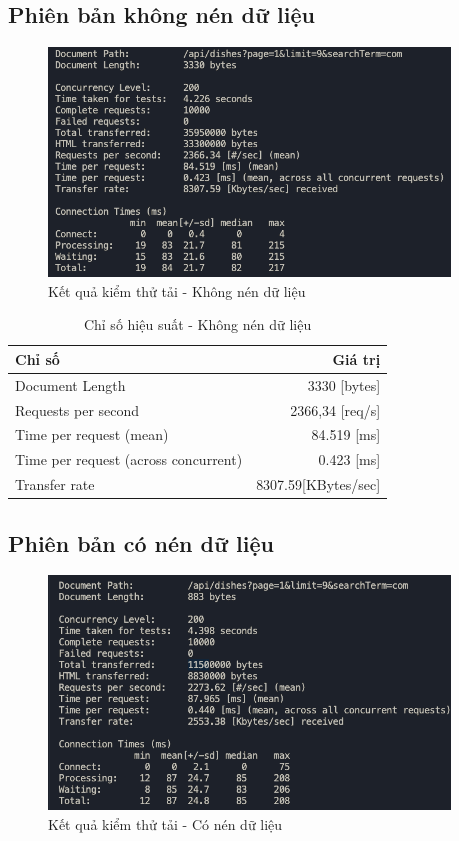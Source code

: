 \subsection{Phiên bản không nén dữ liệu}
\begin{figure}[H]
    \centering
    \includegraphics[width=0.95\textwidth]{images/no-compress.png}
    \caption{Kết quả kiểm thử tải - Không nén dữ liệu}
    \label{fig:no-compress}
\end{figure}

\begin{table}[H]
    \centering
    \caption{Chỉ số hiệu suất - Không nén dữ liệu}
    \begin{tabular}{|l|r|}
    \hline
    \textbf{Chỉ số} & \textbf{Giá trị} \\
    \hline
    Document Length & 3330 [bytes] \\
    Requests per second & 2366,34 [req/s] \\
    Time per request (mean) & 84.519 [ms] \\
    Time per request (across concurrent) & 0.423 [ms] \\
    Transfer rate & 8307.59[KBytes/sec] \\
    \hline
    \end{tabular}
    \label{tab:no-compress}
\end{table}


\subsection{Phiên bản có nén dữ liệu}
\begin{figure}[H]
    \centering
    \includegraphics[width=0.95\textwidth]{images/compress.png}
    {\footnotesize \caption{Kết quả kiểm thử tải - Có nén dữ liệu}}
    \label{fig:compress}
\end{figure}

